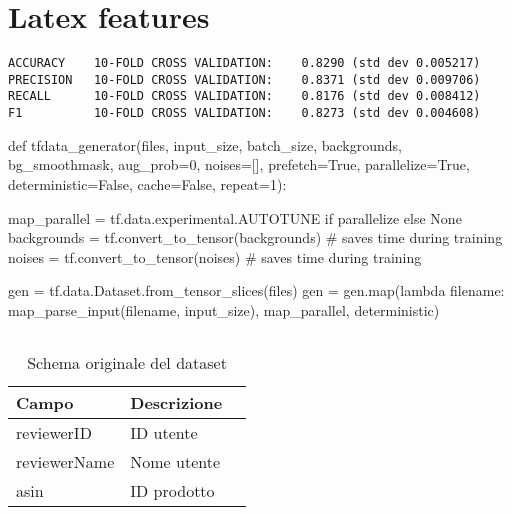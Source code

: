 

\chapter{Latex features}
\label{chap:test}


\begin{verbatim}
ACCURACY    10-FOLD CROSS VALIDATION:    0.8290 (std dev 0.005217)
PRECISION   10-FOLD CROSS VALIDATION:    0.8371 (std dev 0.009706)
RECALL      10-FOLD CROSS VALIDATION:    0.8176 (std dev 0.008412)
F1          10-FOLD CROSS VALIDATION:    0.8273 (std dev 0.004608)
\end{verbatim}

\begin{python}
def tfdata_generator(files, input_size, batch_size, backgrounds, 
					 bg_smoothmask, aug_prob=0, noises=[],
					 prefetch=True, parallelize=True, 
					 deterministic=False, cache=False, repeat=1):

	map_parallel = tf.data.experimental.AUTOTUNE if parallelize else None
	backgrounds = tf.convert_to_tensor(backgrounds) # saves time during training
	noises = tf.convert_to_tensor(noises) # saves time during training

	gen = tf.data.Dataset.from_tensor_slices(files)
	gen = gen.map(lambda filename: map_parse_input(filename, input_size), map_parallel, deterministic)
\end{python}

\begin{lstlisting}[frame=none,caption={Listing description}, 
label=lst:label-name]
\end{lstlisting}

\begin{table}[H]
	\caption{Schema originale del dataset}\label{tab:df-schema}
	\centering
	\begin{tabular}{|l|l|l|}
		\hline
		Campo & Descrizione \\
		\hline
		reviewerID & ID utente \\
		reviewerName & Nome utente \\
		asin & ID prodotto \\
		\hline
	\end{tabular}
\end{table}